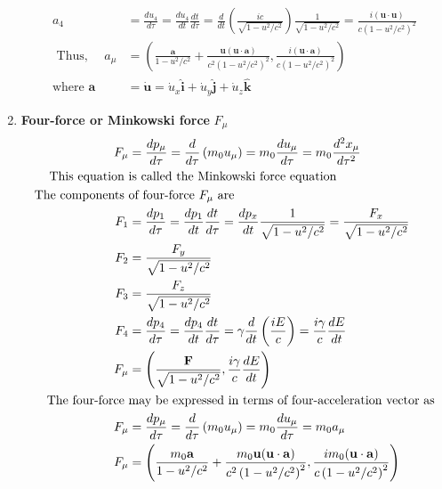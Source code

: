 \begin{enumerate}
\begin{align*}
	a_{4}&=\frac{d u_{4}}{d \tau}=\frac{d u_{4}}{d t} \frac{d t}{d \tau}=\frac{d}{d t}\left(\frac{i c}{\sqrt{1-u^{2} / c^{2}}}\right) \frac{1}{\sqrt{1-u^{2} / c^{2}}}=\frac{i(\mathbf{u} \cdot \mathbf{u})}{c\left(1-u^{2} / c^{2}\right)^{2}}\\
	\text { Thus, } \quad a_{\mu}&=\left(\frac{\mathbf{a}}{1-u^{2} / c^{2}}+\frac{\mathbf{u}(\mathbf{u} \cdot \mathbf{a})}{c^{2}\left(1-u^{2} / c^{2}\right)^{2}}, \frac{i(\mathbf{u} \cdot \mathbf{a})}{c\left(1-u^{2} / c^{2}\right)^{2}}\right)\\
\text{where } \mathbf{a}&=\dot{\mathbf{u}}=\dot{u}_{x} \hat{\mathbf{i}}+\dot{u}_{y} \hat{\mathbf{j}}+\dot{u}_{z} \hat{\mathbf{k}}
	\end{align*}
	\item \textbf { Four-force or Minkowski force } $F_{\mu}$
	\begin{align}
	F_{\mu}&=\frac{d p_{\mu}}{d \tau}=\frac{d}{d \tau}\left(m_{0} u_{\mu}\right)=m_{0} \frac{d u_{\mu}}{d \tau}=m_{0} \frac{d^{2} x_{\mu}}{d \tau^{2}} \notag\\
	\text{This equation  }&\text{is called the Minkowski force equation}\notag\\
	\text{The components  }&\text{of four-force $F_{\mu}$ are}\notag\\
	F_{1}&=\frac{d p_{1}}{d \tau}=\frac{d p_{1}}{d t} \frac{d t}{d \tau}=\frac{d p_{x}}{d t} \frac{1}{\sqrt{1-u^{2} / c^{2}}}=\frac{F_{x}}{\sqrt{1-u^{2} / c^{2}}}\notag \\
	F_{2}&=\frac{F_{y}}{\sqrt{1-u^{2} / c^{2}}} \notag\\
	F_{3}&=\frac{F_{z}}{\sqrt{1-u^{2} / c^{2}}} \notag\\
	F_{4}&=\frac{d p_{4}}{d \tau}=\frac{d p_{4}}{d t} \frac{d t}{d \tau}=\gamma \frac{d}{d t}\left(\frac{i E}{c}\right)=\frac{i \gamma}{c} \frac{d E}{d t} \notag\\
	F_{\mu}&=\left(\frac{\mathbf{F}}{\sqrt{1-u^{2} / c^{2}}}, \frac{i \gamma}{c} \frac{d E}{d t}\right) \label{ref.str1}\\
	\text{The four-force }&\text{may be  expressed in terms of four-acceleration vector as}\notag\\
	F_{\mu}&=\frac{d p_{\mu}}{d \tau}=\frac{d}{d \tau}\left(m_{0} u_{\mu}\right)=m_{0} \frac{d u_{\mu}}{d \tau}=m_{0} a_{\mu}\notag\\
	F_{\mu}&=\left(\frac{m_{0} \mathbf{a}}{1-u^{2} / c^{2}}+\frac{m_{0} \mathbf{u}(\mathbf{u} \cdot \mathbf{a})}{c^{2}\left(1-u^{2} / c^{2}\right)^{2}}, \frac{i m_{0}(\mathbf{u} \cdot \mathbf{a})}{c\left(1-u^{2} / c^{2}\right)^{2}}\right)\label{ref.str2}\\

\end{align}
\end{enumerate}
